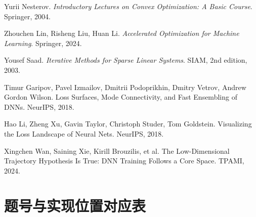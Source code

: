 \documentclass[UTF8,a4paper,12pt,fontset=none]{ctexart}
\begin{document}
\begin{enumerate}[label={[\arabic*]}]
\item Yurii Nesterov. \emph{Introductory Lectures on Convex Optimization: A Basic Course}. Springer, 2004.
\item Zhouchen Lin, Risheng Liu, Huan Li. \emph{Accelerated Optimization for Machine Learning}. Springer, 2024.
\item Yousef Saad. \emph{Iterative Methods for Sparse Linear Systems}. SIAM, 2nd edition, 2003.
\item Timur Garipov, Pavel Izmailov, Dmitrii Podoprikhin, Dmitry Vetrov, Andrew Gordon Wilson. Loss Surfaces, Mode Connectivity, and Fast Ensembling of DNNs. NeurIPS, 2018.
\item Hao Li, Zheng Xu, Gavin Taylor, Christoph Studer, Tom Goldstein. Visualizing the Loss Landscape of Neural Nets. NeurIPS, 2018.
\item Xingchen Wan, Saining Xie, Kirill Brouzilis, et al. The Low-Dimensional Trajectory Hypothesis Is True: DNN Training Follows a Core Space. TPAMI, 2024.
\end{enumerate}

\appendix
\clearpage
\section{题号与实现位置对应表}
\end{document}
